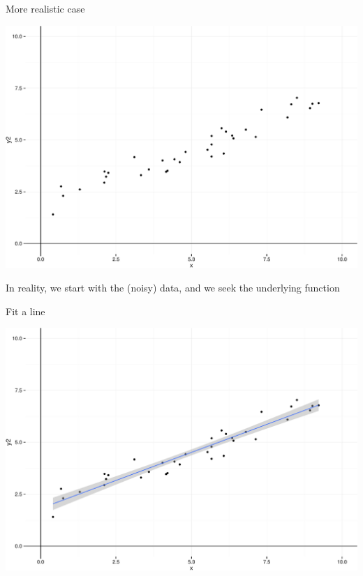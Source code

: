 \documentclass[ignorenonframetext,]{beamer}
\begin{document}
\begin{frame}{More realistic case}

\includegraphics{Regression_files/figure-beamer/unnamed-chunk-4-1.pdf}

\begin{block}{In reality, we start with the (noisy) data, and we seek
the underlying function}

\end{block}

\end{frame}

\begin{frame}{Fit a line}

\includegraphics{Regression_files/figure-beamer/unnamed-chunk-5-1.pdf}

\end{frame}
\end{document}
